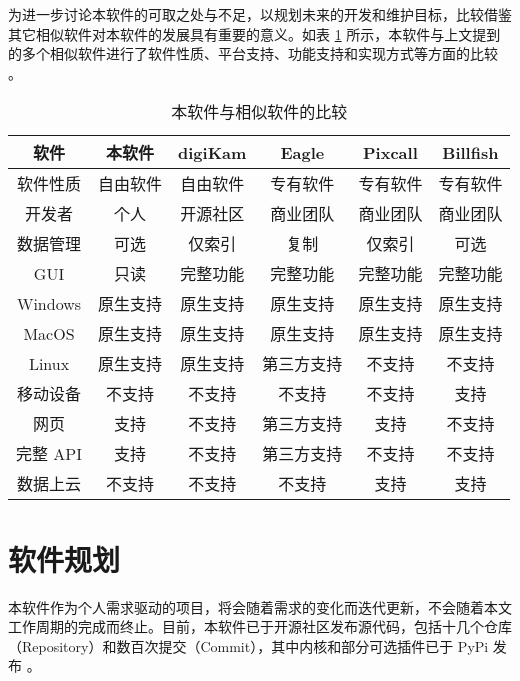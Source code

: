 为进一步讨论本软件的可取之处与不足，以规划未来的开发和维护目标，比较借鉴其它相似软件对本软件的发展具有重要的意义。如表 \ref{table:cmp} 所示，本软件与上文提到的多个相似软件进行了软件性质、平台支持、功能支持和实现方式等方面的比较 \cite{eagle} \cite{pixcall} \cite{billfish} \cite{digikam}。

\begin{table}[h!]
\centering
\begin{tabular}{|c|ccccc|} 
    \hline
    软件 &
    本软件 & digiKam & 
    Eagle & Pixcall & Billfish\\ 
    \hline
    软件性质 &
    自由软件 & 自由软件 &
    专有软件 & 专有软件 & 专有软件 \\
    \hline
    开发者 &
    个人 & 开源社区 &
    商业团队 & 商业团队 & 商业团队 \\
    \hline
    数据管理 &
    可选 & 仅索引 &
    复制 & 仅索引 & 可选 \\
    \hline
    GUI &
    只读 & 完整功能 &
    完整功能 & 完整功能 & 完整功能 \\
    \hline
    Windows &
    原生支持 & 原生支持 &
    原生支持 & 原生支持 & 原生支持 \\
    \hline
    MacOS &
    原生支持 & 原生支持 &
    原生支持 & 原生支持 & 原生支持 \\
    \hline
    Linux &
    原生支持 & 原生支持 &
    第三方支持 & 不支持 & 不支持 \\
    \hline
    移动设备 &
    不支持 & 不支持 &
    不支持 & 不支持 & 支持 \\
    \hline
    网页 &
    支持 & 不支持 &
    第三方支持 & 支持 & 不支持 \\
    \hline
    完整 API &
    支持 & 不支持 &
    第三方支持 & 不支持 & 不支持 \\
    \hline
    数据上云 &
    不支持 & 不支持 &
    不支持 & 支持 & 支持 \\
    \hline
\end{tabular}
\caption{本软件与相似软件的比较}
\label{table:cmp}
\end{table}

\section{软件规划}

本软件作为个人需求驱动的项目，将会随着需求的变化而迭代更新，不会随着本文工作周期的完成而终止。目前，本软件已于开源社区发布源代码，包括十几个仓库（Repository）和数百次提交（Commit），其中内核和部分可选插件已于 PyPi 发布 \cite{ohmytmp}。

